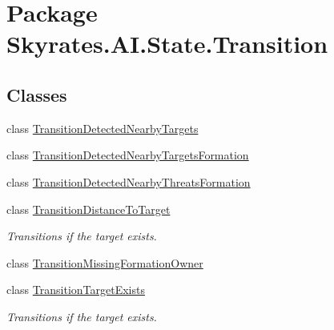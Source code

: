 \hypertarget{namespace_skyrates_1_1_a_i_1_1_state_1_1_transition}{\section{Package Skyrates.\-A\-I.\-State.\-Transition}
\label{namespace_skyrates_1_1_a_i_1_1_state_1_1_transition}
}
\subsection*{Classes}
\begin{DoxyCompactItemize}
\item 
class \hyperlink{class_skyrates_1_1_a_i_1_1_state_1_1_transition_1_1_transition_detected_nearby_targets}{Transition\-Detected\-Nearby\-Targets}
\item 
class \hyperlink{class_skyrates_1_1_a_i_1_1_state_1_1_transition_1_1_transition_detected_nearby_targets_formation}{Transition\-Detected\-Nearby\-Targets\-Formation}
\item 
class \hyperlink{class_skyrates_1_1_a_i_1_1_state_1_1_transition_1_1_transition_detected_nearby_threats_formation}{Transition\-Detected\-Nearby\-Threats\-Formation}
\item 
class \hyperlink{class_skyrates_1_1_a_i_1_1_state_1_1_transition_1_1_transition_distance_to_target}{Transition\-Distance\-To\-Target}
\begin{DoxyCompactList}\small\item\em Transitions if the target exists. \end{DoxyCompactList}\item 
class \hyperlink{class_skyrates_1_1_a_i_1_1_state_1_1_transition_1_1_transition_missing_formation_owner}{Transition\-Missing\-Formation\-Owner}
\item 
class \hyperlink{class_skyrates_1_1_a_i_1_1_state_1_1_transition_1_1_transition_target_exists}{Transition\-Target\-Exists}
\begin{DoxyCompactList}\small\item\em Transitions if the target exists. \end{DoxyCompactList}\end{DoxyCompactItemize}

